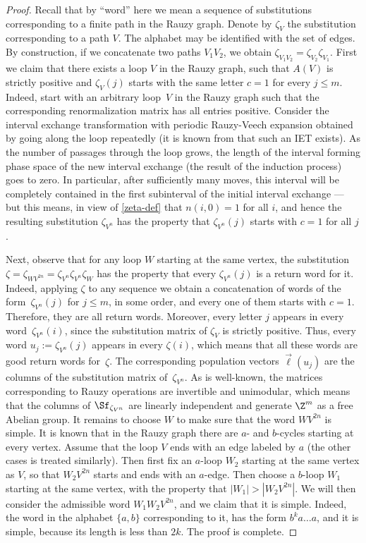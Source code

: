 \begin{proof}
Recall that by ``word'' here we mean a sequence of substitutions corresponding to a finite path in the Rauzy graph. Denote by $\zeta_V$ the substitution corresponding to a path $V$.
The
alphabet may be identified with the set of edges. By construction, if we concatenate two paths $V_1 V_2$, we obtain
$
\zeta_{V_1 V_2} = \zeta_{V_2} \zeta_{V_1}.
$
First we claim that there exists a loop $V$ in the Rauzy graph, such that $A(V)$ is strictly positive and $\zeta_V(j)$ starts with the same letter $c=1$ for every $j\le m$.
Indeed, start with an arbitrary loop~$V$ in the Rauzy graph such that the corresponding renormalization matrix has all entries positive. Consider the interval exchange transformation with periodic
Rauzy-Veech expansion obtained by going along the loop repeatedly (it is known from \cite{veech} that such an IET exists).
As the number of passages through the loop grows, the length of the interval forming phase space of the new interval exchange (the result of the induction process) goes to zero. In particular, after sufficiently many moves, this interval will be completely contained in the first subinterval of the initial interval exchange --- but this means, in view of \eqref{zeta-def} that $n(i,0)=1$ for all $i$, and hence the resulting substitution
$\zeta_{V^n}$
has the property that
$\zeta_{V^n}(j)$
starts with $c=1$ for all $j$.\enlargethispage{.5\baselineskip}%

Next, observe that for any loop $W$ starting at the same vertex, the substitution
$\zeta=
\zeta_{WV^{2n}} = \zeta_{V^n}\zeta_{V^n}\zeta_W$ has the property that every $\zeta_{V^n}(j)$ is a return word for it. Indeed, applying $\zeta$ to any sequence we obtain a concatenation of words of the form~$\zeta_{V^n}(j)$ for $j\le m$, in some order, and every one of them starts with $c=1$. Therefore, they are all return words. Moreover, every letter $j$ appears in every
word~$\zeta_{V^n}(i)$, since the substitution matrix of $\zeta_V$ is strictly positive. Thus,
every word $u_j:=
\zeta_{V^n}(j)$ appears in every $\zeta(i)$, which means that all these words are good return words for~$\zeta$. The corresponding population vectors
$\vec\ell(u_j)$ are the columns of the substitution matrix of~$\zeta_{V^n}$. As is well-known, the matrices corresponding to Rauzy operations are invertible and unimodular, which means that the columns of $\Sf_{\zeta_{V^n}}$ are linearly independent and generate $\Z^m$ as a free Abelian group.
It remains to choose $W$ to make sure that the word $WV^{2n}$ is simple. It is known that in the Rauzy graph there are $a$- and $b$-cycles starting at every vertex. Assume that the loop $V$ ends with an edge labeled by $a$ (the other cases is treated similarly). Then first fix an $a$-loop $W_2$ starting at the same vertex as $V$, so that $W_2 V^{2n}$ starts and ends with an $a$-edge. Then choose a $b$-loop $W_1$ starting at the same vertex, with the property that
$|W_1|> |W_2 V^{2n}|$. We will then consider the admissible word $W_1 W_2 V^{2n}$, and we claim that it is simple. Indeed, the word in the alphabet $\{a,b\}$ corresponding to it, has the form $b^k a\ldots a$, and it is simple, because its length is less than $2k$. The proof is complete.
\end{proof}
